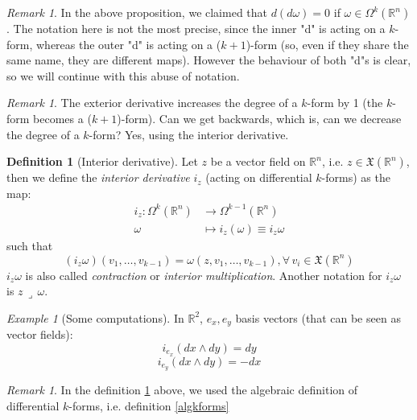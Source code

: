 \documentclass[a4paper,11pt,titlepage, article, oneside]{memoir}
\numberwithin{equation}{section}
\theoremstyle{definition}
\newtheorem{definition}[theorem]{Definition}
\theoremstyle{remark}
\newtheorem{remark}[theorem]{Remark}
\newtheorem{example}[theorem]{Example}
\newcommand{\rfield}{\mathbb{R}}
\begin{document}
\begin{remarkbox}\begin{remark} \label{abusenot1}
  In the above proposition, we claimed that $d(d\omega)  = 0$ if $\omega \in \Omega^k(\rfield^n)$. The notation here is not the most precise, since the inner "d" is acting on a $k$-form, whereas the outer "d" is acting on a ($k+1$)-form (so, even if they share the same name, they are different maps). However the behaviour of both "d"s is clear, so we will continue with this abuse of notation.
\end{remark}\end{remarkbox}

\begin{remarkbox}\begin{remark}
  The exterior derivative increases the degree of a $k$-form by 1 (the $k$-form becomes a ($k+1$)-form). Can we get backwards, which is, can we decrease the degree of a $k$-form? Yes, using the interior derivative.
\end{remark}\end{remarkbox}

\begin{definition}[Interior derivative] \label{intder}
  Let $z$ be a vector field on $\rfield^n$, i.e. $z \in \mathfrak{X}(\rfield^n)$, then we define the \textit{interior derivative} $i_z$ (acting on differential $k$-forms) as the map:
  \begin{align}
    i_z \colon \Omega^k(\rfield^n) &\rightarrow \Omega^{k-1}(\rfield^n) \\
    \omega &\mapsto i_z(\omega) \equiv i_z \omega \nonumber
  \end{align}
  such that
  $$(i_z \omega) (v_1, \ldots, v_{k-1}) = \omega(z, v_1, \ldots, v_{k-1}), \forall \, v_i \in \mathfrak{X}(\rfield^n)$$
  $i_z \omega$ is also called  \textit{contraction} or \textit{interior multiplication}. Another notation for $i_z \omega$ is $z \, \lrcorner \, \omega$.
\end{definition}

\begin{tcolorbox}\begin{example}[Some computations]
  In $\rfield^2$, $e_x, e_y$ basis vectors (that can be seen as vector fields):
  $$i_{e_x}(dx \wedge dy) = dy$$
  $$i_{e_y}(dx \wedge dy) = - dx$$
\end{example}\end{tcolorbox}

\begin{remarkbox}\begin{remark}
  In the definition \ref{intder} above, we used the algebraic definition of differential $k$-forms, i.e. definition \ref{algkforms}
\end{remark}\end{remarkbox}
\end{document}
